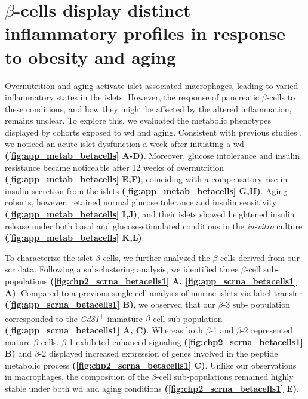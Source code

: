 \section[$\beta$-cells display distinct inflammatory profiles in response to obesity and aging]{$\beta$-cells display distinct inflammatory profiles in response\\to obesity and aging}
\label{sec:chp2_betacells}
Overnutrition and aging activate islet-associated macrophages, leading to varied inflammatory states in the islets. However, the response of pancreatic $\beta$-cells to these conditions, and how they might be affected by the altered inflammation, remains unclear. To explore this, we evaluated the metabolic phenotypes displayed by cohorts exposed to \gls{wd} and aging. Consistent with previous studies \textbf{\cite{}}, we noticed an acute islet dysfunction a week after initiating a \gls{wd} \textbf{(\autoref{fig:app_metab_betacells} A-D)}. Moreover, glucose intolerance and insulin resistance became noticeable after 12 weeks of overnutrition \textbf{(\autoref{fig:app_metab_betacells} E,F)}, coinciding with a compensatory rise in insulin secretion from the islets \textbf{(\autoref{fig:app_metab_betacells} G,H)}. Aging cohorts, however, retained normal glucose tolerance and insulin sensitivity \textbf{(\autoref{fig:app_metab_betacells} I,J)}, and their islets showed heightened insulin release under both basal and glucose-stimulated conditions in the \textit{in-vitro} culture \textbf{(\autoref{fig:app_metab_betacells} K,L)}.\\

\par To characterize the islet $\beta$-cells, we further analyzed the $\beta$-cells derived from our \gls{scr} data. Following a sub-clustering analysis, we identified three $\beta$-cell sub-populations \textbf{(\autoref{fig:chp2_scrna_betacells1} A, \autoref{fig:app_scrna_betacells1} A)}. Compared to a previous single-cell analysis of 
murine islets \textbf{\cite{sachs_targeted_2020}} via label transfer \textbf{(\autoref{fig:app_scrna_betacells1} B)}, we observed that our $\beta$-3 sub-
population corresponded to the \textit{Cd81}\textsuperscript{+} immature $\beta$-cell sub-population \textbf{(\autoref{fig:app_scrna_betacells1} A, C)}. Whereas both $\beta$-1 and $\beta$-2 represented mature $\beta$-cells. $\beta$-1 exhibited enhanced  signaling \textbf{(\autoref{fig:chp2_scrna_betacells1} B)} and $\beta$-2 displayed increased expression of genes involved in the peptide metabolic process \textbf{(\autoref{fig:chp2_scrna_betacells1} C)}. Unlike our observations in macrophages, the composition of the $\beta$-cell sub-populations remained highly stable under both \gls{wd} and aging conditions \textbf{(\autoref{fig:chp2_scrna_betacells1} E)}.\\


